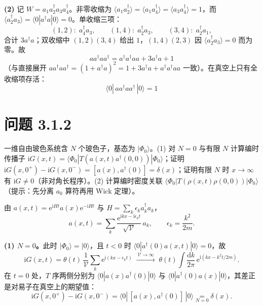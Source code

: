 \textbf{(2)} 记 $W=a_1a_2^{\dagger}a_3a_4^{\dagger}$。非零收缩为 $\langle a_1a_2^{\dagger}\rangle=\langle a_1a_4^{\dagger}\rangle=\langle a_3a_4^{\dagger}\rangle=1$，而 $\langle a_2^{\dagger}a_3\rangle=\langle 0|a^{\dagger}a|0\rangle=0$。单收缩三项：
\begin{equation*}
(1,2):\;a_4^{\dagger}a_3,\qquad (1,4):\;a_2^{\dagger}a_3,\qquad (3,4):\;a_2^{\dagger}a_1,
\end{equation*}
合计 $3a^{\dagger}a$；双收缩中 $(1,2)(3,4)$ 给出 $1$，$(1,4)(2,3)$ 因 $\langle a_2^{\dagger}a_3\rangle=0$ 而为零。故
\begin{equation*}
aa^{\dagger}aa^{\dagger}=a^{\dagger}a^{\dagger}aa+3a^{\dagger}a+1
\end{equation*}
（与直接展开 $aa^{\dagger}aa^{\dagger}=(1+a^{\dagger}a)^{2}=1+3a^{\dagger}a+a^{\dagger}a^{\dagger}aa$ 一致）。在真空上只有全收缩项存活：
\begin{equation*}
\boxed{\;\langle 0|\,aa^{\dagger}aa^{\dagger}\,|0\rangle=1\;}
\end{equation*}

\section*{问题 3.1.2}
\begin{problem}
一维自由玻色系统含 $N$ 个玻色子，基态为 $|\Phi_0\rangle$。(1) 对 $N=0$ 与有限 $N$ 计算编时传播子 $\mathrm{i}G(x,t)=\langle\Phi_0|T(a(x,t)a^{\dagger}(0,0))|\Phi_0\rangle$；证明 $\mathrm{i}G(x,0^{+})-\mathrm{i}G(x,0^{-})=[a(x),a^{\dagger}(0)]=\delta(x)$；证明有限 $N$ 时 $x\to\infty$ 有 $\mathrm{i}G\neq0$（非对角长程序）。(2) 计算编时密度关联 $\langle\Phi_0|T(\rho(x,t)\rho(0,0))|\Phi_0\rangle$（提示：先分离 $a_0$ 算符再用 Wick 定理）。
\end{problem}
\solution

由 $a(x,t)=\mathrm{e}^{\mathrm{i}Ht}a(x)\mathrm{e}^{-\mathrm{i}Ht}$ 与 $H=\sum_k\epsilon_ka_k^{\dagger}a_k$，
\begin{equation*}
a(x,t)=\sum_k\frac{\mathrm{e}^{\mathrm{i}kx-\mathrm{i}\epsilon_kt}}{\sqrt{\mathcal{V}}}\,a_k ,
\qquad \epsilon_k=\frac{k^{2}}{2m}.
\end{equation*}

\textbf{(1) $N=0$。}此时 $|\Phi_0\rangle=|0\rangle$，且 $t<0$ 时 $\langle 0|a^{\dagger}(0)a(x,t)|0\rangle=0$，故
\begin{equation*}
\mathrm{i}G(x,t)=\theta(t)\,\frac{1}{\mathcal{V}}\sum_k\mathrm{e}^{\mathrm{i}(kx-\epsilon_kt)}
\;\xrightarrow{\ \mathcal{V}\to\infty\ }\;
\theta(t)\int\frac{\mathrm{d}k}{2\pi}\,\mathrm{e}^{\mathrm{i}(kx-k^{2}t/2m)} .
\end{equation*}
在 $t=0$ 处，$T$ 序两侧分别为 $\langle0|a(x)a^{\dagger}(0)|0\rangle$ 与 $\langle0|a^{\dagger}(0)a(x)|0\rangle$，其差正是对易子在真空上的期望值：
\begin{equation*}
\mathrm{i}G(x,0^{+})-\mathrm{i}G(x,0^{-})=\langle0|\,[a(x),a^{\dagger}(0)]\,|0\rangle
\underset{N=0}{=}\delta(x) .
\end{equation*}

